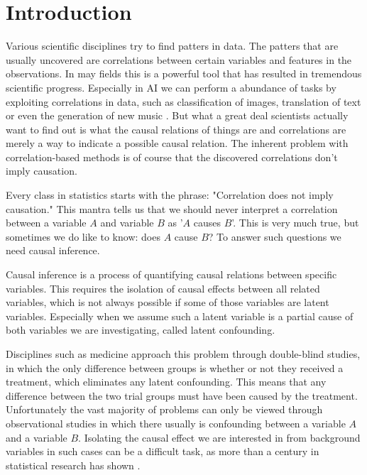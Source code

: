 \documentclass{report}
\begin{document}
\chapter{Introduction}
Various scientific disciplines try to find patters in data. The patters that are usually uncovered are correlations between certain variables and features in the observations. In may fields this is a powerful tool that has resulted in tremendous scientific progress. Especially in AI we can perform a abundance of tasks by exploiting correlations in data, such as classification of images, translation of text or even the generation of new music \cite{deng2009imagenet} \cite{krizhevsky2012imagenet} \cite{bahdanau2014neural} \cite{payne2019musenet}.
But what a great deal scientists actually want to find out is what the causal relations of things are and correlations are merely a way to indicate a possible causal relation. The inherent problem with correlation-based methods is of course that the discovered correlations don't imply causation.

Every class in statistics starts with the phrase: "Correlation does not imply causation." This mantra tells us that we should never interpret a correlation between a variable $A$ and variable $B$ as '$A$ causes $B$'. This is very much true, but sometimes we do like to know: does $A$ cause $B$? To answer such questions we need causal inference. 

Causal inference is a process of quantifying causal relations between specific variables. This requires the isolation of causal effects between all related variables, which is not always possible if some of those variables are latent variables. Especially when we assume such a latent variable is a partial cause of both variables we are investigating, called latent confounding.

Disciplines such as medicine approach this problem through double-blind studies, in which the only difference between groups is whether or not they received a treatment, which eliminates any latent confounding. This means that any difference between the two trial groups must have been caused by the treatment\cite{gotzsche1989methodology}. Unfortunately the vast majority of problems can only be viewed through observational studies in which there usually is confounding between a variable $A$ and a variable $B$. Isolating the causal effect we are interested in from background variables in such cases can be a difficult task, as more than a century in statistical research has shown \cite{pearson1900x} \cite{fisher1936design} \cite{huff1993lie} \cite{ioannidis2005most}.
\end{document}
